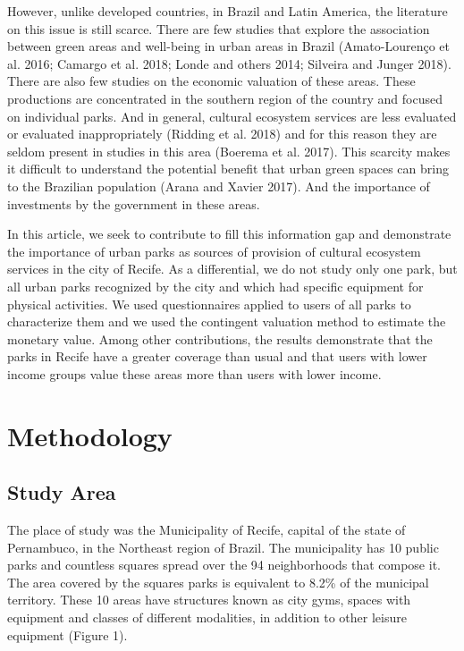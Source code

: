 \documentclass[
]{article}
\begin{document}
However, unlike developed countries, in Brazil and Latin America, the
literature on this issue is still scarce. There are few studies that
explore the association between green areas and well-being in urban
areas in Brazil (Amato-Lourenço et al. 2016; Camargo et al. 2018; Londe
and others 2014; Silveira and Junger 2018). There are also few studies
on the economic valuation of these areas. These productions are
concentrated in the southern region of the country and focused on
individual parks. And in general, cultural ecosystem services are less
evaluated or evaluated inappropriately (Ridding et al. 2018) and for
this reason they are seldom present in studies in this area (Boerema et
al. 2017). This scarcity makes it difficult to understand the potential
benefit that urban green spaces can bring to the Brazilian population
(Arana and Xavier 2017). And the importance of investments by the
government in these areas.

In this article, we seek to contribute to fill this information gap and
demonstrate the importance of urban parks as sources of provision of
cultural ecosystem services in the city of Recife. As a differential, we
do not study only one park, but all urban parks recognized by the city
and which had specific equipment for physical activities. We used
questionnaires applied to users of all parks to characterize them and we
used the contingent valuation method to estimate the monetary value.
Among other contributions, the results demonstrate that the parks in
Recife have a greater coverage than usual and that users with lower
income groups value these areas more than users with lower income.

\hypertarget{sec:1}{%
\section{Methodology}\label{sec:1}}

\hypertarget{sec:2}{%
\subsection{Study Area}\label{sec:2}}

The place of study was the Municipality of Recife, capital of the state
of Pernambuco, in the Northeast region of Brazil. The municipality has
10 public parks and countless squares spread over the 94 neighborhoods
that compose it. The area covered by the squares parks is equivalent to
8.2\% of the municipal territory. These 10 areas have structures known
as city gyms, spaces with equipment and classes of different modalities,
in addition to other leisure equipment (Figure 1).
\end{document}

